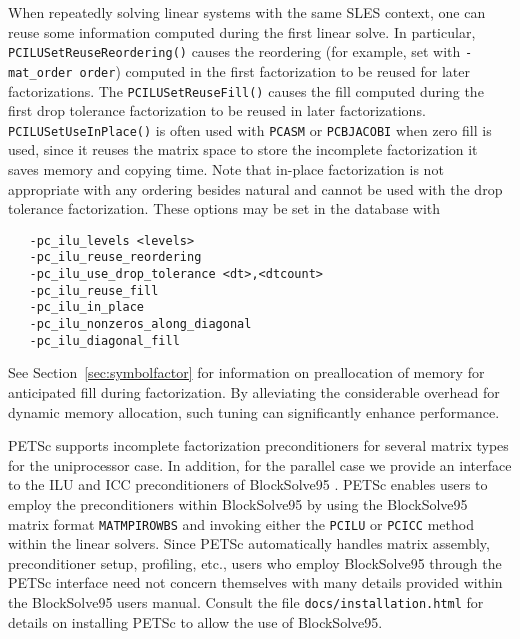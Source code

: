 When repeatedly solving linear systems with the same SLES
context, one can reuse some information  computed
during the first linear solve.
In particular, {\tt PCILUSetReuseReordering()} causes the reordering  (for example, set with 
{\tt -mat\_order order}) computed in the first factorization to be reused
for later factorizations.  
The {\tt  PCILUSetReuseFill()} causes the 
fill computed during the first drop tolerance factorization to be reused
in later factorizations. {\tt PCILUSetUseInPlace()} is often used with 
{\tt PCASM} or {\tt PCBJACOBI} when zero fill is used, since it reuses the 
matrix space to store the incomplete factorization it saves memory and 
copying time. Note that in-place factorization is not appropriate with 
any ordering besides natural and cannot be used with the drop tolerance
factorization. These options may be set in the database with 
\begin{verbatim}
   -pc_ilu_levels <levels>
   -pc_ilu_reuse_reordering
   -pc_ilu_use_drop_tolerance <dt>,<dtcount>
   -pc_ilu_reuse_fill
   -pc_ilu_in_place
   -pc_ilu_nonzeros_along_diagonal
   -pc_ilu_diagonal_fill
\end{verbatim}
 
 
 

See Section~\ref{sec:symbolfactor} for information on preallocation
of memory for anticipated fill during factorization.
By alleviating the considerable overhead for dynamic memory allocation,
such tuning can significantly enhance performance.

PETSc supports incomplete factorization preconditioners for several matrix
types for the uniprocessor case.  
 In addition, for the parallel case
we provide an interface to the ILU and ICC preconditioners
of BlockSolve95 \cite{bs-user-ref}.   PETSc enables users
to employ the preconditioners within
BlockSolve95 by using the BlockSolve95 matrix format {\tt MATMPIROWBS}
and invoking either the {\tt PCILU} or {\tt PCICC} method within the linear
solvers.  Since PETSc automatically handles matrix assembly,
preconditioner setup, profiling, etc., users who employ BlockSolve95
through the PETSc interface need not concern themselves with many
details provided within the BlockSolve95 users manual. Consult the file
{\tt docs/installation.html} for details on installing PETSc to allow 
the use of BlockSolve95.

